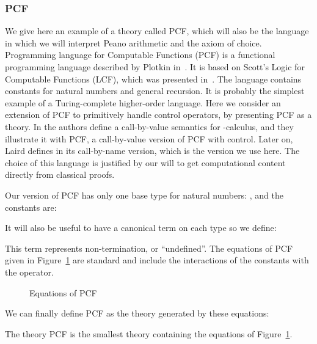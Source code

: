 \documentclass{CSML}
\begin{document}
\subsubsection{\texorpdfstring{}{mu}PCF}
\label{muPCF}
We give here an example of a  theory called PCF, which will also be the language in which we will interpret Peano arithmetic and the axiom of choice. Programming language for Computable Functions (PCF) is a functional programming language described by Plotkin in~\cite{PlotkinPCF}. It is based on Scott's Logic for Computable Functions (LCF), which was presented in~\cite{ScottLCF}. The language contains constants for natural numbers and general recursion. It is probably the simplest example of a Turing-complete higher-order language. Here we consider an extension of PCF to primitively handle control operators, by presenting PCF as a  theory. In \cite{OngStewartControl} the authors define a call-by-value semantics for -calculus, and they illustrate it with PCF, a call-by-value version of PCF with control. Later on, Laird defines in \cite{LairdThesis} its call-by-name version, which is the version we use here. The choice of this language is justified by our will to get computational content directly from classical proofs.\par
Our version of PCF has only one base type for natural numbers: , and the constants are:

It will also be useful to have a canonical term on each type so we define:

This term represents non-termination, or ``undefined''. The equations of PCF given in Figure~\ref{muPCFEq} are standard and include the interactions of the constants with the  operator.
\begin{figure}

\caption{Equations of PCF}
\label{muPCFEq}
\end{figure}
We can finally define PCF as the  theory generated by these equations:
\begin{defi}[PCF]
The  theory PCF is the smallest  theory containing the equations of Figure~\ref{muPCFEq}.
\end{defi}
\end{document}
